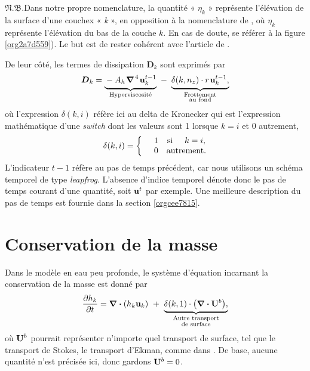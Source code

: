 \documentclass[10pt]{report}
\numberwithin{equation}{section}
\newcommand{\uu}{\vb{u}}
\newcommand{\tall}{\vphantom{pA^{x^x}_p}}
\newcommand{\pt}{\hspace{1pt}} %
\newcommand{\nb}{\underline{{\footnotesize\EightStarConvex}\pt $\mathfrak{N.B.}$\vphantom{p}}\hspace{3pt}}
\begin{document}
\nb Dans notre propre nomenclature, la quantité « \(\eta_k\) » représente l'élévation de la surface d'une couchex « \emph{k} », en opposition à la nomenclature de \Textcite{vallis_2006}, où \(\eta_k\) représente l'élévation du bas de la couche \(k\).
En cas de doute, se référer à la figure \ref{org2a7d559}).
Le but est de rester cohérent avec l'article de \textcite{chen_2021}.
\bigskip

De leur côté, les termes de dissipation \(\boldsymbol{D}_k\) sont exprimés par
\begin{equation}
   \boldsymbol{D}_k = \underbrace{\tall-A_h\pt\gradient^{\pt4}\pt\uu^{t-1}_k}_\text{Hyperviscosité}
   \ - \ \underbrace{\tall\delta(k,n_z) \cdot r\pt \uu^{t-1}_k,}_{\substack{\text{Frottement}\\\text{au fond}}}
\end{equation}
où l'expression \(\delta(k,i)\) réfère ici au delta de Kronecker qui est l'expression mathématique d'une \emph{switch} dont les valeurs sont 1 lorsque \(k=i\) et 0 autrement,
\begin{equation}
   \delta(k,i) = \left\lbrace \hspace{0.2cm}\begin{matrix}
     \hspace{0.3cm}1 & \text{si}\hspace{0.5cm} k=i, \\
     \hspace{0.3cm}0 & \text{autrement}.
   \end{matrix}\right.
\end{equation}
L'indicateur \(t-1\) réfère au pas de temps précédent, car nous utilisons un schéma temporel de type \emph{leapfrog}.
L'absence d'indice temporel dénote donc le pas de temps courant d'une quantité, soit \(\uu^t\) par exemple. 
Une meilleure description du pas de temps est fournie dans la section \ref{orgcee7815}. \bigskip

\section{Conservation de la masse}
\label{sec:org8503419}

Dans le modèle en eau peu profonde, le système d'équation incarnant la conservation de la masse est donné par
\begin{equation}
   \pdv{h_k}{t} =  \divergence(h_k\uu_k)\ +\ \underbrace{\delta(k,1)\cdot \qty(\divergence{\vb{U}^b}),}_{\substack{\text{Autre transport}\\ \text{de surface}}}
\end{equation}
où \(\vb{U}^b\) pourrait représenter n'importe quel transport de surface, tel que le transport de Stokes, le transport d'Ekman, comme dans \Textcite{chen_2021}.
De base, aucune quantité n'est précisée ici, donc gardons \(\vb{U}^b = 0\). 
\end{document}

